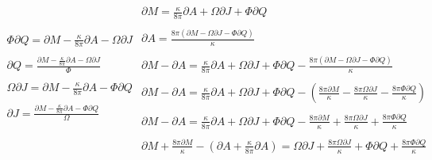 \begin{equation*}
\begin{array}{lll}
 \displaystyle  \Phi \partial Q = \partial M - \frac{\kappa}{8 \pi} \partial A - \Omega \partial J \\\\
 \displaystyle  \partial Q = \frac{\partial M - \frac{\kappa}{8 \pi} \partial A - \Omega \partial J}{\Phi} \\\\

 \displaystyle  \Omega \partial J = \partial M - \frac{\kappa}{8 \pi} \partial A - \Phi \partial Q \\\\
 \displaystyle  \partial J = \frac{\partial M - \frac{\kappa}{8 \pi} \partial A - \Phi \partial Q}{\Omega} \\\\

\end{array}

\displaystyle \begin{array}{lll}\\
 \displaystyle  \partial M = \frac{\kappa}{8 \pi} \partial A + \Omega \partial J + \Phi \partial Q \\\\
 \displaystyle  \partial A = \frac{8 \pi(\partial M - \Omega \partial J - \Phi \partial Q)}{\kappa}\\\\

 \displaystyle  \partial M - \partial A = \frac{\kappa}{8 \pi} \partial A + \Omega \partial J + \Phi \partial Q - \frac{8 \pi(\partial M - \Omega \partial J - \Phi \partial Q)}{\kappa}\\\\
 \displaystyle  \partial M - \partial A = \frac{\kappa}{8 \pi} \partial A + \Omega \partial J + \Phi \partial Q - (\frac{8 \pi \partial M}{\kappa} - \frac{8 \pi \Omega \partial J}{\kappa} - \frac{8 \pi \Phi \partial Q}{\kappa})\\\\
 \displaystyle  \partial M - \partial A = \frac{\kappa}{8 \pi} \partial A + \Omega \partial J + \Phi \partial Q - \frac{8 \pi \partial M}{\kappa} + \frac{8 \pi \Omega \partial J}{\kappa} + \frac{8 \pi \Phi \partial Q}{\kappa}\\\\
 \displaystyle  \partial M + \frac{8 \pi \partial M}{\kappa} - (\partial A + \frac{\kappa}{8 \pi} \partial A) = \Omega \partial J + \frac{8 \pi \Omega \partial J}{\kappa} + \Phi \partial Q + \frac{8 \pi \Phi \partial Q}{\kappa}\\\\


\end{array}
\end{equation*}
